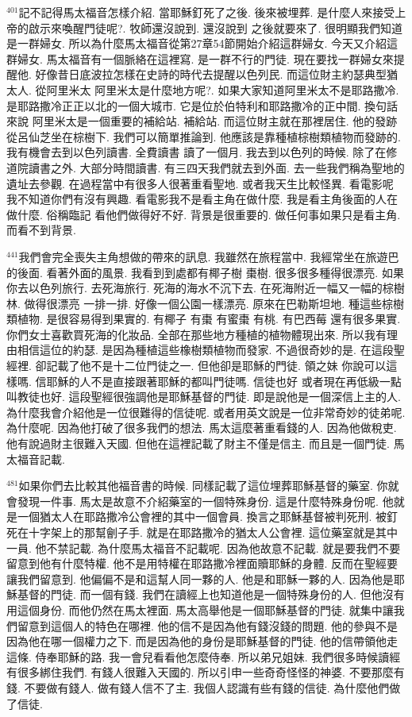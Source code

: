 \documentclass{book}
\begin{document}
$^{401}$記不記得馬太福音怎樣介紹.
當耶穌釘死了之後.
後來被埋葬.
是什麼人來接受上帝的啟示來喚醒門徒呢?.
牧師還沒說到.
還沒說到 之後就要來了.
很明顯我們知道是一群婦女.
所以為什麼馬太福音從第27章54節開始介紹這群婦女.
今天又介紹這群婦女.
馬太福音有一個脈絡在這裡寫.
是一群不行的門徒.
現在要找一群婦女來提醒他.
好像昔日底波拉怎樣在史詩的時代去提醒以色列民.
而這位財主約瑟典型猶太人.
從阿里米太 阿里米太是什麼地方呢?.
如果大家知道阿里米太不是耶路撒冷.
是耶路撒冷正正以北的一個大城市.
它是位於伯特利和耶路撒冷的正中間.
換句話來說 阿里米太是一個重要的補給站.
補給站.
而這位財主就在那裡居住.
他的發跡從呂仙芝坐在棕樹下.
我們可以簡單推論到.
他應該是靠種植棕樹類植物而發跡的.
我有機會去到以色列讀書.
全費讀書 讀了一個月.
我去到以色列的時候.
除了在修道院讀書之外.
大部分時間讀書.
有三四天我們就去到外面.
去一些我們稱為聖地的遺址去參觀.
在過程當中有很多人很著重看聖地.
或者我天生比較怪異.
看電影呢 我不知道你們有沒有興趣.
看電影我不是看主角在做什麼.
我是看主角後面的人在做什麼.
俗稱臨記 看他們做得好不好.
背景是很重要的.
做任何事如果只是看主角.
而看不到背景.

$^{441}$我們會完全喪失主角想做的帶來的訊息.
我雖然在旅程當中.
我經常坐在旅遊巴的後面.
看著外面的風景.
我看到到處都有椰子樹 棗樹.
很多很多種得很漂亮.
如果你去以色列旅行.
去死海旅行.
死海的海水不沉下去.
在死海附近一幅又一幅的棕樹林.
做得很漂亮 一排一排.
好像一個公園一樣漂亮.
原來在巴勒斯坦地.
種這些棕樹類植物.
是很容易得到果實的.
有椰子 有棗 有蜜棗 有桃.
有巴西莓 還有很多果實.
你們女士喜歡買死海的化妝品.
全部在那些地方種植的植物體現出來.
所以我有理由相信這位的約瑟.
是因為種植這些橡樹類植物而發家.
不過很奇妙的是.
在這段聖經裡.
卻記載了他不是十二位門徒之一.
但他卻是耶穌的門徒.
領之妹 你說可以這樣嗎.
信耶穌的人不是直接跟著耶穌的都叫門徒嗎.
信徒也好 或者現在再低級一點叫教徒也好.
這段聖經很強調他是耶穌基督的門徒.
即是說他是一個深信上主的人.
為什麼我會介紹他是一位很難得的信徒呢.
或者用英文說是一位非常奇妙的徒弟呢.
為什麼呢.
因為他打破了很多我們的想法.
馬太這麼著重看錢的人.
因為他做稅吏.
他有說過財主很難入天國.
但他在這裡記載了財主不僅是信主.
而且是一個門徒.
馬太福音記載.

$^{481}$如果你們去比較其他福音書的時候.
同樣記載了這位埋葬耶穌基督的藥室.
你就會發現一件事.
馬太是故意不介紹藥室的一個特殊身份.
這是什麼特殊身份呢.
他就是一個猶太人在耶路撒冷公會裡的其中一個會員.
換言之耶穌基督被判死刑.
被釘死在十字架上的那幫劊子手.
就是在耶路撒冷的猶太人公會裡.
這位藥室就是其中一員.
他不禁記載.
為什麼馬太福音不記載呢.
因為他故意不記載.
就是要我們不要留意到他有什麼特權.
他不是用特權在耶路撒冷裡面贖耶穌的身體.
反而在聖經要讓我們留意到.
他偏偏不是和這幫人同一夥的人.
他是和耶穌一夥的人.
因為他是耶穌基督的門徒.
而一個有錢.
我們在讀經上也知道他是一個特殊身份的人.
但他沒有用這個身份.
而他仍然在馬太裡面.
馬太高舉他是一個耶穌基督的門徒.
就集中讓我們留意到這個人的特色在哪裡.
他的信不是因為他有錢沒錢的問題.
他的參與不是因為他在哪一個權力之下.
而是因為他的身份是耶穌基督的門徒.
他的信帶領他走這條.
侍奉耶穌的路.
我一會兒看看他怎麼侍奉.
所以弟兄姐妹.
我們很多時候讀經有很多綁住我們.
有錢人很難入天國的.
所以引申一些奇奇怪怪的神婆.
不要那麼有錢.
不要做有錢人.
做有錢人信不了主.
我個人認識有些有錢的信徒.
為什麼他們做了信徒.
\end{document}
